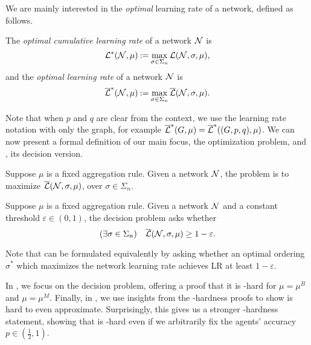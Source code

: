 We are mainly interested in the \emph{optimal} learning rate of a network, defined as follows.

\begin{definition}
    The \emph{optimal cumulative learning rate} of a network $ \mathcal{N} $ is \[
        \mathcal{L}^* (\mathcal{N}, \mu) \mathbin{:=} \max_{\sigma \in \Sigma_n} \mathcal{L} (\mathcal{N}, \sigma, \mu),
    \]
    and the \emph{optimal learning rate} of a network $ \mathcal{N} $ is \[
        \overline{\mathcal{L}}^* (\mathcal{N}, \mu) \mathbin{:=} \max_{\sigma \in \Sigma_n} \overline{\mathcal{L}} (\mathcal{N}, \sigma, \mu).
    \]
\end{definition}

Note that when $ p $ and $ q $ are clear from the context, we use the learning rate notation with only the graph, for example $ \overline{\mathcal{L}}^* (G, \mu) = \overline{\mathcal{L}}^*(( G,p,q ), \mu) $.
We can now present a formal definition of our main focus, the \netlearnopt{} optimization problem, and \netlearn{}, its decision version.

\begin{definition}[\netlearnopt{}]
    Suppose $\mu$ is a fixed aggregation rule.
    Given a network $ \mathcal{N} $, the \netlearnopt{} problem is to maximize  $ \overline{\mathcal{L}} (\mathcal{N}, \sigma, \mu) $, over $ \sigma \in \Sigma_n $.
\end{definition}


\begin{definition}[\netlearn{}]\label{def:decnetlearn}
    Suppose $\mu$ is a fixed aggregation rule.
    Given a network $ \mathcal{N} $ and a constant threshold $ \varepsilon \in (0,1)$,
    the \netlearn{} decision problem asks whether \[
            ( \exists \sigma \in \Sigma_n )\quad \overline{\mathcal{L}} (\mathcal{N}, \sigma, \mu) \geq 1-\varepsilon.
        \]
\end{definition}

Note that  can be formulated equivalently by asking whether an optimal ordering $\sigma^*$ which maximizes the network learning rate achieves LR at least $1-\varepsilon$.

In , we focus on the decision problem, offering a proof that it is \np-hard for $ \mu = \mu^B $ and $ \mu = \mu^M $.
Finally, in , we use insights from the \np-hardness proofs to show \netlearnopt{} is hard to even approximate.
Surprisingly, this gives us a stronger \np-hardness statement, showing that \netlearn{} is \np-hard even if we arbitrarily fix the agents' accuracy $ p \in ( \frac 12, 1 ) $.
